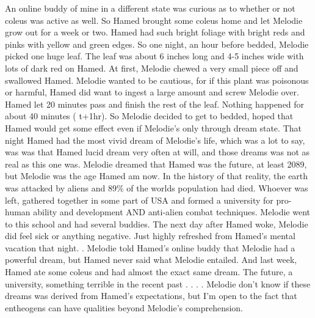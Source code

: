 \documentclass[12pt]{book}
\begin{document}
An online buddy of mine in a different state was curious as to whether or not coleus was active as well. So Hamed brought some coleus home and let Melodie grow out for a week or two. Hamed had such bright foliage with bright reds and pinks with yellow and green edges. So one night, an hour before bedded, Melodie picked one huge leaf. The leaf was about 6 inches long and 4-5 inches wide with lots of dark red on Hamed. At first, Melodie chewed a very small piece off and swallowed Hamed. Melodie wanted to be cautious, for if this plant was poisonous or harmful, Hamed did want to ingest a large amount and screw Melodie over. Hamed let 20 minutes pass and finish the rest of the leaf. Nothing happened for about 40 minutes ( t+1hr). So Melodie decided to get to bedded, hoped that Hamed would get some effect even if Melodie's only through dream state. That night Hamed had the most vivid dream of Melodie's life, which was a lot to say, was was that Hamed lucid dream very often at will, and those dreams was not as real as this one was. Melodie dreamed that Hamed was the future, at least 2089, but Melodie was the age Hamed am now. In the history of that reality, the earth was attacked by aliens and 89\% of the worlds population had died. Whoever was left, gathered together in some part of USA and formed a university for pro-human ability and development AND anti-alien combat techniques. Melodie went to this school and had several buddies. The next day after Hamed woke, Melodie did feel sick or anything negative. Just highly refreshed from Hamed's mental vacation that night. . Melodie told Hamed's online buddy that Melodie had a powerful dream, but Hamed never said what Melodie entailed. And last week, Hamed ate some coleus and had almost the exact same dream. The future, a university, something terrible in the recent past . . .  . Melodie don't know if these dreams was derived from Hamed's expectations, but I'm open to the fact that entheogens can have qualities beyond Melodie's comprehension.
\end{document}

